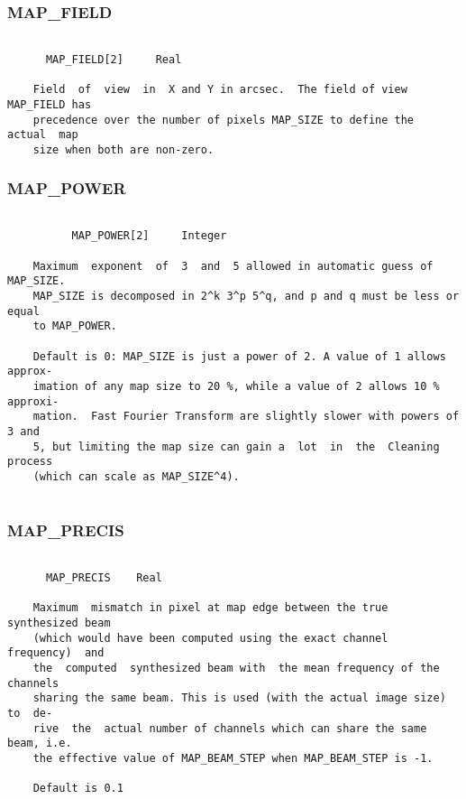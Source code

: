 \subsubsection{MAP\_FIELD}
\begin{verbatim}

      MAP_FIELD[2]     Real

    Field  of  view  in  X and Y in arcsec.  The field of view MAP_FIELD has
    precedence over the number of pixels MAP_SIZE to define the  actual  map
    size when both are non-zero.

\end{verbatim}
\subsubsection{MAP\_POWER}
\begin{verbatim}

          MAP_POWER[2]     Integer

    Maximum  exponent  of  3  and  5 allowed in automatic guess of MAP_SIZE.
    MAP_SIZE is decomposed in 2^k 3^p 5^q, and p and q must be less or equal
    to MAP_POWER.

    Default is 0: MAP_SIZE is just a power of 2. A value of 1 allows approx-
    imation of any map size to 20 %, while a value of 2 allows 10 % approxi-
    mation.  Fast Fourier Transform are slightly slower with powers of 3 and
    5, but limiting the map size can gain a  lot  in  the  Cleaning  process
    (which can scale as MAP_SIZE^4).


\end{verbatim}
\subsubsection{MAP\_PRECIS}
\begin{verbatim}

      MAP_PRECIS    Real

    Maximum  mismatch in pixel at map edge between the true synthesized beam
    (which would have been computed using the exact channel  frequency)  and
    the  computed  synthesized beam with  the mean frequency of the channels
    sharing the same beam. This is used (with the actual image size) to  de-
    rive  the  actual number of channels which can share the same beam, i.e.
    the effective value of MAP_BEAM_STEP when MAP_BEAM_STEP is -1.

    Default is 0.1

\end{verbatim}
